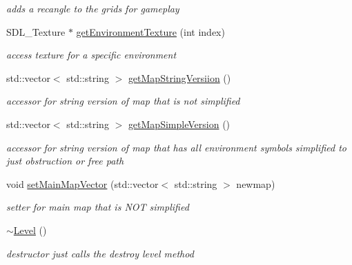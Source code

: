 \begin{DoxyCompactItemize}
\begin{DoxyCompactList}\small\item\em adds a recangle to the grids for gameplay \end{DoxyCompactList}\item 
\hypertarget{class_level_a419a998f8496fb65d593eea06b454f18}{}\label{class_level_a419a998f8496fb65d593eea06b454f18} 
S\+D\+L\+\_\+\+Texture $\ast$ \hyperlink{class_level_a419a998f8496fb65d593eea06b454f18}{get\+Environment\+Texture} (int index)
\begin{DoxyCompactList}\small\item\em access texture for a specific environment \end{DoxyCompactList}\item 
\hypertarget{class_level_a3ca47ac48d1454c5f68a3c61b8073ce1}{}\label{class_level_a3ca47ac48d1454c5f68a3c61b8073ce1} 
std\+::vector$<$ std\+::string $>$ \hyperlink{class_level_a3ca47ac48d1454c5f68a3c61b8073ce1}{get\+Map\+String\+Versiion} ()
\begin{DoxyCompactList}\small\item\em accessor for string version of map that is not simplified \end{DoxyCompactList}\item 
\hypertarget{class_level_a36e2b0bc3c817fa70eb4b618edcb6d70}{}\label{class_level_a36e2b0bc3c817fa70eb4b618edcb6d70} 
std\+::vector$<$ std\+::string $>$ \hyperlink{class_level_a36e2b0bc3c817fa70eb4b618edcb6d70}{get\+Map\+Simple\+Version} ()
\begin{DoxyCompactList}\small\item\em accessor for string version of map that has all environment symbols simplified to just obstruction or free path \end{DoxyCompactList}\item 
\hypertarget{class_level_a5087842ccd1a2b5f1e4dc0bab6d6823c}{}\label{class_level_a5087842ccd1a2b5f1e4dc0bab6d6823c} 
void \hyperlink{class_level_a5087842ccd1a2b5f1e4dc0bab6d6823c}{set\+Main\+Map\+Vector} (std\+::vector$<$ std\+::string $>$ newmap)
\begin{DoxyCompactList}\small\item\em setter for main map that is N\+OT simplified \end{DoxyCompactList}\item 
\hypertarget{class_level_a249eac1e8f19ff44134efa5e986feaca}{}\label{class_level_a249eac1e8f19ff44134efa5e986feaca} 
\hyperlink{class_level_a249eac1e8f19ff44134efa5e986feaca}{$\sim$\+Level} ()
\begin{DoxyCompactList}\small\item\em destructor just calls the destroy level method \end{DoxyCompactList}\end{DoxyCompactItemize}
